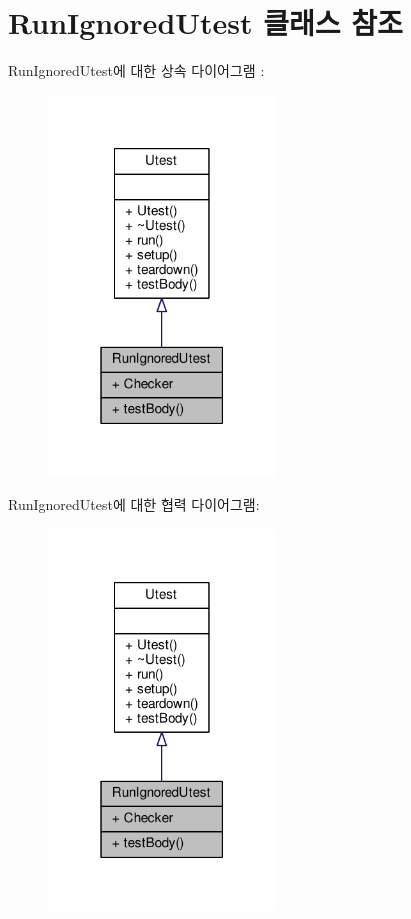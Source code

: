 \hypertarget{class_run_ignored_utest}{}\section{Run\+Ignored\+Utest 클래스 참조}
\label{class_run_ignored_utest}


Run\+Ignored\+Utest에 대한 상속 다이어그램 \+: 
\nopagebreak
\begin{figure}[H]
\begin{center}
\leavevmode
\includegraphics[width=171pt]{class_run_ignored_utest__inherit__graph}
\end{center}
\end{figure}


Run\+Ignored\+Utest에 대한 협력 다이어그램\+:
\nopagebreak
\begin{figure}[H]
\begin{center}
\leavevmode
\includegraphics[width=171pt]{class_run_ignored_utest__coll__graph}
\end{center}
\end{figure}
